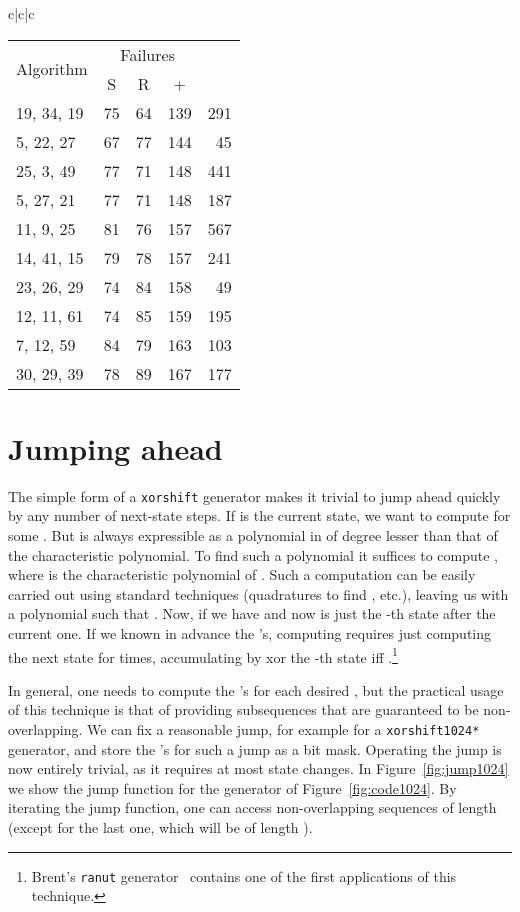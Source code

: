 \documentclass{acmsmalltr}
\newcommand{\xorshift}[1][]{\texttt{xorshift#1}\xspace}
\newcommand{\xorshifts}[1][]{\texttt{xorshift#1*}\xspace}
\newcommand{\xst}[3]{#1, #2, #3}
\begin{document}
\begin{sidewaystable}
{\begin{tabular}{c|c|c}
\begin{tabular}{l|rr|r|r}
\multirow{2}{*}{Algorithm} & \multicolumn{3}{c|}{Failures}  & \multirow{2}{*}{}\\
& \multicolumn{1}{c}{S} & \multicolumn{1}{c|}{R} & \multicolumn{1}{c|}{+} \\
\hline
\xst{19}{34}{19} & 75 & 64 & 139 & 291\\
\xst{5}{22}{27} & 67 & 77 & 144 & 45\\
\xst{25}{3}{49} & 77 & 71 & 148 & 441\\
\xst{5}{27}{21} & 77 & 71 & 148 & 187\\
\xst{11}{9}{25} & 81 & 76 & 157 & 567\\
\xst{14}{41}{15} & 79 & 78 & 157 & 241\\
\xst{23}{26}{29} & 74 & 84 & 158 & 49\\
\xst{12}{11}{61} & 74 & 85 & 159 & 195\\
\xst{7}{12}{59} & 84 & 79 & 163 & 103\\
\xst{30}{29}{39} & 78 & 89 & 167 & 177\\
\end{tabular}
\end{tabular}}
\end{sidewaystable}

\section{Jumping ahead}

The simple form of a \xorshift generator makes it trivial to jump ahead quickly
by any number of next-state steps. If  is the current state, we want to
compute  for some . But  is always expressible as a
polynomial in  of degree lesser than that of the characteristic polynomial.
To find such a polynomial it suffices to compute , where 
is the characteristic polynomial of . Such a computation can be easily
carried out using standard techniques (quadratures to find ,
etc.), leaving us with a polynomial  such that . Now, if  we have  and now  is just the -th state
after the current one. If we known in advance the 's, computing  requires just computing the next state for  times, accumulating by xor
the -th state iff .\footnote{Brent's
\texttt{ranut} generator~\cite{BreURNGS} contains one of the first
applications of this technique.}

In general, one needs to compute the 's for each desired , but the
practical usage of this technique is that of providing subsequences that are
guaranteed to be non-overlapping. We can fix a reasonable jump, for example
 for a \xorshifts[1024] generator, and store the 's for such a
jump as a bit mask. Operating the jump is now entirely trivial, as it requires
at most  state changes. In Figure~\ref{fig:jump1024} we show the jump function
for the generator of Figure~\ref{fig:code1024}. By iterating the jump function,
one can access  non-overlapping sequences of length  (except for
the last one, which will be of length ).
\end{document}
